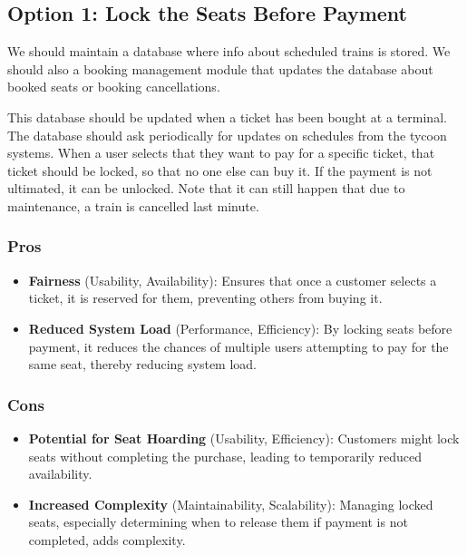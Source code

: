 \subsection*{Option 1: Lock the Seats Before Payment}
We should maintain a database where info about scheduled trains is stored. 
We should also a booking management module that updates the database about booked seats or booking cancellations.

This database should be updated when a ticket has been bought at a terminal. The database should ask periodically for updates on schedules from the tycoon systems. When a user selects that they want to pay for a specific ticket, that ticket should be locked, so that no one else can buy it. If the payment is not ultimated, it can be unlocked. Note that it can still happen that due to maintenance, a train is cancelled last minute. 


\subsubsection*{Pros}
\begin{itemize}[noitemsep]
    \item \textbf{Fairness} (Usability, Availability): Ensures that once a customer selects a ticket, it is reserved for them, preventing others from buying it.
    \item \textbf{Reduced System Load} (Performance, Efficiency): By locking seats before payment, it reduces the chances of multiple users attempting to pay for the same seat, thereby reducing system load.
\end{itemize}
\subsubsection*{Cons}
\begin{itemize}[noitemsep]
    \item \textbf{Potential for Seat Hoarding} (Usability, Efficiency): Customers might lock seats without completing the purchase, leading to temporarily reduced availability.
    \item \textbf{Increased Complexity} (Maintainability, Scalability): Managing locked seats, especially determining when to release them if payment is not completed, adds complexity.
\end{itemize}
